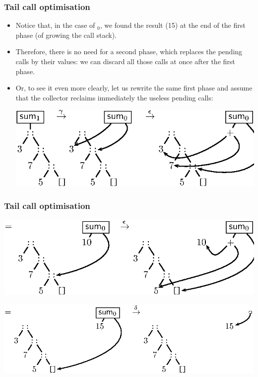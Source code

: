 \documentclass[compress,dvips,xcolor={dvipsnames},t]{beamer}
\begin{document}
\begin{frame}
  \frametitle{Tail call optimisation}

  \begin{itemize}

    \item Notice that, in the case of $_0$, we found the
      result (15) at the end of the first phase (of growing the call
      stack).

    \item Therefore, there is no need for a second phase, which
      replaces the pending calls by their values: we can discard all
      those calls at once after the first phase.

    \item Or, to see it even more clearly, let us rewrite the same
      first phase and assume that the collector reclaims immediately
      the useless pending calls:
      \begin{center}
        \includegraphics[scale=0.9,bb=148 585 402 664]{sum0_375tco0}
      \end{center}

  \end{itemize}

\end{frame}

\begin{frame}
  \frametitle{Tail call optimisation}

  \begin{center}
    \hspace*{-15mm}
    \includegraphics[bb=148 585 414 664]{sum0_375tco1}
  \end{center}
  \begin{center}
    \hspace*{-15mm}
    \includegraphics[bb=148 585 414 664]{sum0_375tco2}
  \end{center}

\end{frame}
\end{document}
